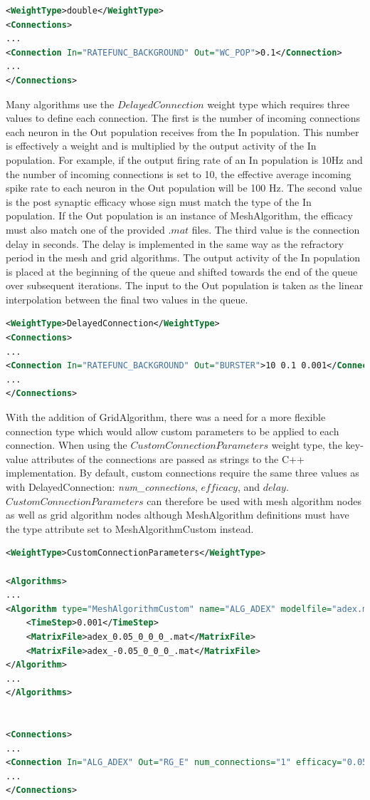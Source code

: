 \documentclass[utf8]{frontiersSCNS} %
\begin{document}
\begin{lstlisting}[language=xml]
<WeightType>double</WeightType>
<Connections>
...
<Connection In="RATEFUNC_BACKGROUND" Out="WC_POP">0.1</Connection>
...
</Connections>
\end{lstlisting}

Many algorithms use the $DelayedConnection$ weight type which requires three values to define each connection. The first is the number of incoming connections each neuron in the Out population receives from the In population. This number is effectively a weight and is multiplied by the output activity of the In population. For example, if the output firing rate of an In population is 10Hz and the number of incoming connections is set to 10, the effective average incoming spike rate to each neuron in the Out population will be 100 Hz. The second value is the post synaptic efficacy whose sign must match the type of the In population. If the Out population is an instance of MeshAlgorithm, the efficacy must also match one of the provided $.mat$ files. The third value is the connection delay in seconds. The delay is implemented in the same way as the refractory period in the mesh and grid algorithms. The output activity of the In population is placed at the beginning of the queue and shifted towards the end of the queue over subsequent iterations. The input to the Out population is taken as the linear interpolation between the final two values in the queue. 

\begin{lstlisting}[language=xml]
<WeightType>DelayedConnection</WeightType>
<Connections>
...
<Connection In="RATEFUNC_BACKGROUND" Out="BURSTER">10 0.1 0.001</Connection>
...
</Connections>
\end{lstlisting}

With the addition of GridAlgorithm, there was a need for a more flexible connection type which would allow custom parameters to be applied to each connection. When using the $CustomConnectionParameters$ weight type, the key-value attributes of the connections are passed as strings to the C++ implementation. By default, custom connections require the same three values as with DelayedConnection: \textit{num\_connections}, $efficacy$, and $delay$. $CustomConnectionParameters$ can therefore be used with mesh algorithm nodes as well as grid algorithm nodes although MeshAlgorithm definitions must have the type attribute set to MeshAlgorithmCustom instead.

\begin{lstlisting}[language=xml]
<WeightType>CustomConnectionParameters</WeightType>

<Algorithms>
...
<Algorithm type="MeshAlgorithmCustom" name="ALG_ADEX" modelfile="adex.model" >
	<TimeStep>0.001</TimeStep>
	<MatrixFile>adex_0.05_0_0_0_.mat</MatrixFile>
	<MatrixFile>adex_-0.05_0_0_0_.mat</MatrixFile>
</Algorithm>
...
</Algorithms>


<Connections>
...
<Connection In="ALG_ADEX" Out="RG_E" num_connections="1" efficacy="0.05" delay="0.0"/>
...
</Connections>
\end{lstlisting}
\end{document}
